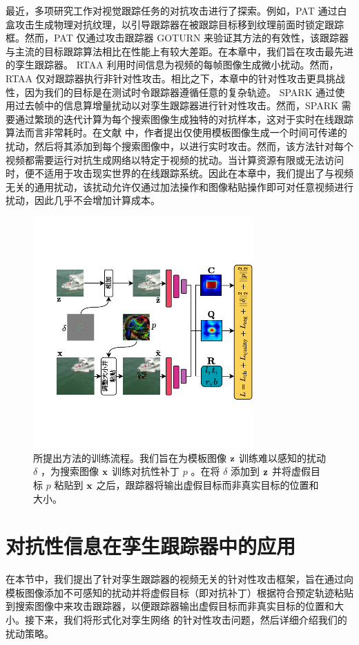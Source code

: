 最近，多项研究工作对视觉跟踪任务的对抗攻击进行了探索。例如，PAT \cite{PAT} 通过白盒攻击生成物理对抗纹理，以引导跟踪器在被跟踪目标移到纹理前面时锁定跟踪框。然而，PAT 仅通过攻击跟踪器 GOTURN \cite{GOTURN} 来验证其方法的有效性，该跟踪器与主流的目标跟踪算法相比在性能上有较大差距。在本章中，我们旨在攻击最先进的孪生跟踪器。
RTAA \cite{RTAA} 利用时间信息为视频的每帧图像生成微小扰动。然而，RTAA 仅对跟踪器执行非针对性攻击。相比之下，本章中的针对性攻击更具挑战性，因为我们的目标是在测试时令跟踪器遵循任意的复杂轨迹。
SPARK \cite{SPARK} 通过使用过去帧中的信息算增量扰动以对孪生跟踪器进行针对性攻击。然而，SPARK 需要通过繁琐的迭代计算为每个搜索图像生成独特的对抗样本，这对于实时在线跟踪算法而言非常耗时。在文献 \cite{TTP} 中，作者提出仅使用模板图像生成一个时间可传递的扰动，然后将其添加到每个搜索图像中，以进行实时攻击。然而，该方法针对每个视频都需要运行对抗生成网络以特定于视频的扰动。当计算资源有限或无法访问时，便不适用于攻击现实世界的在线跟踪系统。因此在本章中，我们提出了与视频无关的通用扰动，该扰动允许仅通过加法操作和图像粘贴操作即可对任意视频进行扰动，因此几乎不会增加计算成本。

\begin{figure}[t]
\centering
\includegraphics[width=0.75\textwidth]{Img/attack/network_v5.pdf}
\caption{所提出方法的训练流程。我们旨在为模板图像 $\textbf z$ 训练难以感知的扰动 $\delta$ ，为搜索图像 $\textbf x$ 训练对抗性补丁 $p$ 。在将 $\delta$ 添加到 $\textbf z$ 并将虚假目标 $p$ 粘贴到 $\textbf x$ 之后，跟踪器将输出虚假目标而非真实目标的位置和大小。}
\label{fig:net}
\end{figure}

\section{对抗性信息在孪生跟踪器中的应用}
在本节中，我们提出了针对孪生跟踪器的视频无关的针对性攻击框架，旨在通过向模板图像添加不可感知的扰动并将虚假目标（即对抗补丁）根据符合预定轨迹粘贴到搜索图像中来攻击跟踪器，以便跟踪器输出虚假目标而非真实目标的位置和大小。接下来，我们将形式化对孪生网络 \cite{SiamFC++} 的针对性攻击问题，然后详细介绍我们的扰动策略。

